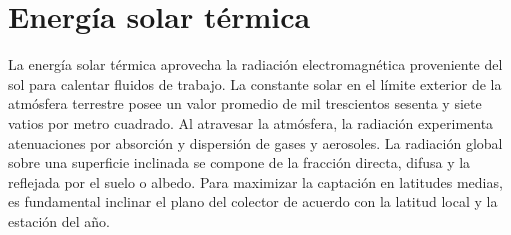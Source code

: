 \section{Energía solar térmica}
\label{sec:cap02_energia_solar}

La energía solar térmica aprovecha la radiación electromagnética proveniente del sol para calentar fluidos de trabajo.
La constante solar en el límite exterior de la atmósfera terrestre posee un valor promedio de mil trescientos sesenta y siete vatios por metro cuadrado.
Al atravesar la atmósfera, la radiación experimenta atenuaciones por absorción y dispersión de gases y aerosoles.
La radiación global sobre una superficie inclinada se compone de la fracción directa, difusa y la reflejada por el suelo o albedo.
Para maximizar la captación en latitudes medias, es fundamental inclinar el plano del colector de acuerdo con la latitud local y la estación del año.
